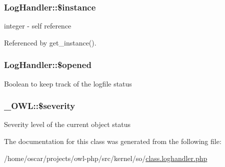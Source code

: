 \subsubsection[{\$instance}]{\setlength{\rightskip}{0pt plus 5cm}LogHandler::\$instance}\label{classLogHandler_a1907cf33534c0b1100fa593c12bcfb6e}
integer -\/ self reference 

Referenced by get\_\-instance().

\subsubsection[{\$opened}]{\setlength{\rightskip}{0pt plus 5cm}LogHandler::\$opened}\label{classLogHandler_a956e7e71a9ff96c6301d1f41a5bf207e}
Boolean to keep track of the logfile status 
\subsubsection[{\$severity}]{\setlength{\rightskip}{0pt plus 5cm}\_\-OWL::\$severity}\label{class__OWL_ad26b40a9dbbacb33e299b17826f8327c}
Severity level of the current object status 

The documentation for this class was generated from the following file:\begin{DoxyCompactItemize}
\item 
/home/oscar/projects/owl-\/php/src/kernel/so/\hyperlink{class_8loghandler_8php}{class.loghandler.php}\end{DoxyCompactItemize}
